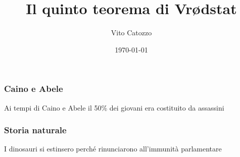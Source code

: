 \documentclass[12pt]{beamer}
\title{Il quinto teorema di Vr\o dstat} %
\author{Vito Catozzo}
\date{\today}
\begin{document}
\frame{\titlepage} %
\begin{frame}
  \frametitle{Caino e Abele}
	Ai tempi di Caino e Abele il 50\% dei giovani era costituito da assassini
\end{frame}
\begin{frame}
  \frametitle{Storia naturale}
	I dinosauri si estinsero perché rinunciarono all'immunità parlamentare
\end{frame}
\end{document}
